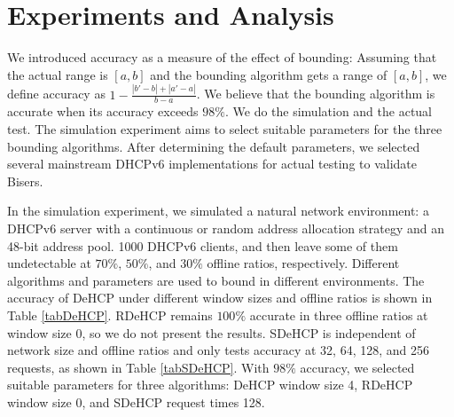 \documentclass[conference]{IEEEtran}
\begin{document}
\section{Experiments and Analysis}

We introduced accuracy as a measure of the effect of bounding:
Assuming that the actual range is $[a, b]$ and the bounding algorithm
gets a range of $[a, b]$, we define accuracy as
$1-\frac{|b'-b|+|a'-a|}{b-a}$. We believe that the bounding algorithm
is accurate when its accuracy exceeds $98\%$. We do the simulation and
the actual test. The simulation experiment aims to select suitable
parameters for the three bounding algorithms. After determining the
default parameters, we selected several mainstream DHCPv6
implementations for actual testing to validate Bisers.

In the simulation experiment, we simulated a natural network
environment: a DHCPv6 server with a continuous or random address
allocation strategy and an 48-bit address pool. 1000 DHCPv6 clients,
and then leave some of them undetectable at $70\%$, $50\%$, and $30\%$
offline ratios, respectively. Different algorithms and parameters are
used to bound in different environments. The accuracy of DeHCP under
different window sizes and offline ratios is shown in Table
\ref{tabDeHCP}. RDeHCP remains $100\%$ accurate in three offline
ratios at window size 0, so we do not present the results. SDeHCP is
independent of network size and offline ratios and only tests accuracy
at 32, 64, 128, and 256 requests, as shown in Table
\ref{tabSDeHCP}. With $98\%$ accuracy, we selected suitable parameters
for three algorithms: DeHCP window size 4, RDeHCP window size 0, and
SDeHCP request times 128.

\begin{table}[htbp]
  \caption{DeHCP experiment result.}
  \begin{center}
    \centering
    \label{tabDeHCP}
  \end{center}
\end{table}
\end{document}
